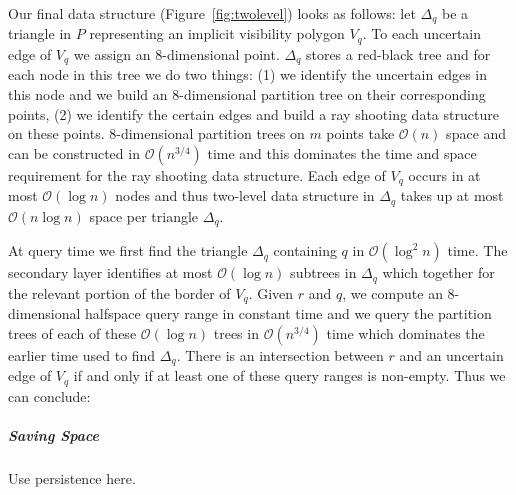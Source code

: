 \documentclass[UKenglish]{lipics-v2019}
\begin{document}
Our final data structure (Figure~\ref{fig:twolevel}) looks as follows: let $\Delta_q$ be a triangle in $P$ representing an implicit visibility polygon $V_q$. To each uncertain edge of $V_q$ we assign an $8$-dimensional point. $\Delta_q$ stores a red-black tree and for each node in this tree we do two things: (1) we identify the uncertain edges in this node and we build an $8$-dimensional partition tree on their corresponding points, (2) we identify the certain edges and build a ray shooting data structure on these points.
$8$-dimensional partition trees on $m$ points take $\mathcal{O}(n)$ space and can be constructed in $\mathcal{O}(n^{3/4})$ time and this dominates the time and space requirement for the ray shooting data structure. Each edge of $V_q$ occurs in at most $\mathcal{O}(\log n)$ nodes and thus two-level data structure in $\Delta_q$ takes up at most $\mathcal{O}(n \log n)$ space per triangle $\Delta_q$.

At query time we first find the triangle $\Delta_q$ containing $q$ in $\mathcal{O}(\log^2 n)$ time. The secondary layer identifies at most $\mathcal{O}(\log n)$ subtrees in $\Delta_q$ which together for the relevant portion of the border of $V_q$. Given $r$ and $q$, we compute an $8$-dimensional halfspace query range in constant time and we query the partition trees of each of these $\mathcal{O}(\log n)$ trees in $\mathcal{O}(n^{3/4})$ time which dominates the earlier time used to find $\Delta_q$. There is an intersection between $r$ and an uncertain edge of $V_q$ if and only if at least one of these query ranges is non-empty.  Thus we can conclude:



\subparagraph{Saving Space} Use persistence here.
\end{document}
